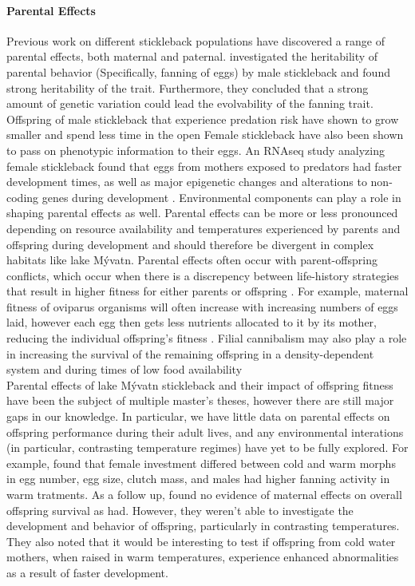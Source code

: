 \documentclass[12pt]{extarticle}
\begin{document}
\paragraph{Parental Effects}
Previous work on different stickleback populations have discovered a range of parental effects, both maternal and paternal. \citet{Bell2018} investigated the heritability of parental behavior (Specifically, fanning of eggs) by male stickleback and found strong heritability of the trait. Furthermore, they concluded that a strong amount of genetic variation could lead the evolvability of the fanning trait. Offspring of male stickleback that experience predation risk have shown to grow smaller and spend less time in the open \citep{Bell2016, Stein2014} Female stickleback have also been shown to pass on phenotypic information to their eggs. An RNAseq study analyzing female stickleback found that eggs from mothers exposed to predators had faster development times, as well as major epigenetic changes and alterations to non-coding genes during development \citep{Mommer2014, Bell2016}. Environmental components can play a role in shaping parental effects as well. Parental effects can be more or less pronounced depending on resource availability and temperatures experienced by parents and offspring during development \citep{Rasanen2007} and should therefore be divergent in complex habitats like lake M\'yvatn. Parental effects often occur with parent-offspring conflicts, which occur when there is a discrepency between life-history strategies that result in higher fitness for either parents or offspring \citep{Uller2008}. For example, maternal fitness of oviparus organisms will often increase with increasing numbers of eggs laid, however each egg then gets less nutrients allocated to it by its mother, reducing the individual offspring's fitness \citep{Uller2008, Rasanen2007}. Filial cannibalism may also play a role in increasing the survival of the remaining offspring in a density-dependent system and during times of low food availability \citep{Bartrons2018} \\
Parental effects of lake M\'yvatn stickleback and their impact of offspring fitness have been the subject of multiple master's theses, however there are still major gaps in our knowledge. In particular, we have little data on parental effects on offspring performance during their adult lives, and any environmental interations (in particular, contrasting temperature regimes) have yet to be fully explored. For example, \citet{Senn} found that female investment differed between cold and warm morphs in egg number, egg size, clutch mass, and males had higher fanning activity in warm tratments. As a follow up, \citet{Diethelm} found no evidence of maternal effects on overall offspring survival as \citet{Senn} had. However, they weren't able to investigate the development and behavior of offspring, particularly in contrasting temperatures. They also noted that it would be interesting to test if offspring from cold water mothers, when raised in warm temperatures, experience enhanced abnormalities as a result of faster development.
\end{document}
